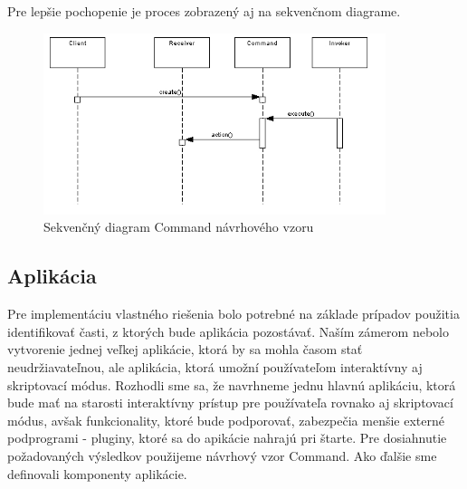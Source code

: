 Pre lepšie pochopenie je proces zobrazený aj na sekvenčnom diagrame.
\begin{figure}[!htbp]
	\centering
	\includegraphics[width=10cm]{img/command_seq.jpg}
	\caption{Sekvenčný diagram Command návrhového vzoru}
	\label{fig:test}
\end{figure}
\newline

\subsection{Aplikácia}
\indent Pre implementáciu vlastného riešenia bolo potrebné na základe prípadov použitia identifikovať časti, z ktorých bude aplikácia pozostávať. Naším zámerom nebolo vytvorenie jednej veľkej aplikácie, ktorá by sa mohla časom stať neudržiavateľnou, ale aplikácia, ktorá umožní používateľom interaktívny aj skriptovací módus. Rozhodli sme sa, že navrhneme jednu hlavnú aplikáciu, ktorá bude mať na starosti interaktívny prístup pre používateľa rovnako aj skriptovací módus, avšak funkcionality, ktoré bude podporovať, zabezpečia menšie externé podprogrami - pluginy, ktoré sa do apikácie nahrajú pri štarte. Pre dosiahnutie požadovaných výsledkov použijeme návrhový vzor Command. Ako ďalšie sme definovali komponenty aplikácie.

